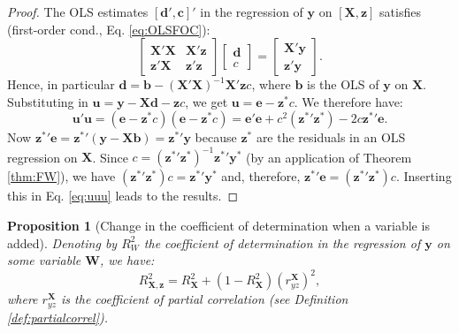 \documentclass[
  12pt,
]{book}
\newtheorem{proposition}{Proposition}[chapter]
\theoremstyle{definition}
\theoremstyle{definition}
\theoremstyle{definition}
\theoremstyle{definition}
\theoremstyle{remark}
\begin{document}
\begin{proof}
The OLS estimates \([\mathbf{d}',\mathbf{c}]'\) in the regression of \(\mathbf{y}\) on \([\mathbf{X},\mathbf{z}]\) satisfies (first-order cond., Eq. \eqref{eq:OLSFOC}):
\[
\left[ \begin{array}{cc} \mathbf{X}'\mathbf{X} & \mathbf{X}'\mathbf{z} \\ \mathbf{z}'\mathbf{X} & \mathbf{z}'\mathbf{z}\end{array}\right]
\left[ \begin{array}{c} \mathbf{d} \\ c\end{array}\right] =
\left[ \begin{array}{c} \mathbf{X}' \mathbf{y} \\ \mathbf{z}' \mathbf{y} \end{array}\right].
\]
Hence, in particular \(\mathbf{d} = \mathbf{b} - (\mathbf{X}'\mathbf{X})^{-1}\mathbf{X}'\mathbf{z}c\), where \(\mathbf{b}\) is the OLS of \(\mathbf{y}\) on \(\mathbf{X}\). Substituting in \(\mathbf{u} = \mathbf{y} - \mathbf{X}\mathbf{d} - \mathbf{z}c\), we get \(\mathbf{u} = \mathbf{e} - \mathbf{z}^*c\). We therefore have:
\begin{equation}
\mathbf{u}'\mathbf{u} = (\mathbf{e} - \mathbf{z}^*c)(\mathbf{e} - \mathbf{z}^*c)= \mathbf{e}'\mathbf{e} + c^2(\mathbf{z^*}'\mathbf{z^*}) - 2 c\mathbf{z^*}'\mathbf{e}.\label{eq:uuu}
\end{equation}
Now \(\mathbf{z^*}'\mathbf{e} = \mathbf{z^*}'(\mathbf{y} - \mathbf{X}\mathbf{b}) = \mathbf{z^*}'\mathbf{y}\) because \(\mathbf{z}^*\) are the residuals in an OLS regression on \(\mathbf{X}\). Since \(c = (\mathbf{z^*}'\mathbf{z^*})^{-1}\mathbf{z^*}'\mathbf{y^*}\) (by an application of Theorem \ref{thm:FW}), we have \((\mathbf{z^*}'\mathbf{z^*})c = \mathbf{z^*}'\mathbf{y^*}\) and, therefore, \(\mathbf{z^*}'\mathbf{e} = (\mathbf{z^*}'\mathbf{z^*})c\). Inserting this in Eq. \eqref{eq:uuu} leads to the results.
\end{proof}

\begin{proposition}[Change in the coefficient of determination when a variable is added]
\protect\hypertarget{prp:chgeInR2}{}\label{prp:chgeInR2}Denoting by \(R_W^2\) the coefficient of determination in the regression of \(\mathbf{y}\) on some variable \(\mathbf{W}\), we have:
\[
R_{\mathbf{X},\mathbf{z}}^2 = R_{\mathbf{X}}^2 + (1-R_{\mathbf{X}}^2)(r_{yz}^\mathbf{X})^2,
\]
where \(r_{yz}^\mathbf{X}\) is the coefficient of partial correlation (see Definition \ref{def:partialcorrel}).
\end{proposition}
\end{document}
